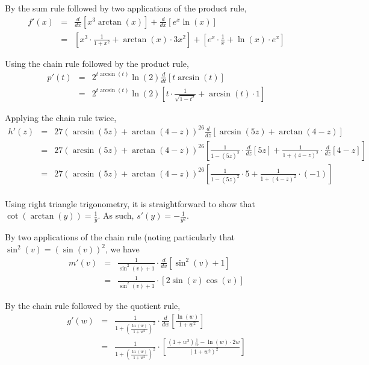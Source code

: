 \begin{activitySolution}
\ba
	  \item By the sum rule followed by two applications of the product rule,
	  \begin{eqnarray*}
	   f'(x) & = & \frac{d}{dx}[x^3 \arctan(x)] + \frac{d}{dx}[e^x \ln(x)] \\
	   	& = & \left[x^3 \cdot \frac{1}{1+x^2} + \arctan(x) \cdot 3x^2 \right] + \left[e^x \cdot \frac{1}{x} + \ln(x) \cdot e^x\right]
	  \end{eqnarray*}
           \item Using the chain rule followed by the product rule,
           \begin{eqnarray*}
           p'(t) & = & 2^{t\arcsin(t)} \ln(2) \frac{d}{dt}[t\arcsin(t)] \\
            	& = & 2^{t\arcsin(t)} \ln(2) [t \cdot \frac{1}{\sqrt{1-t^2}} + \arcsin(t) \cdot 1]
	\end{eqnarray*} 
           \item Applying the chain rule twice,
           \begin{eqnarray*}
            h'(z) & = & 27(\arcsin(5z) + \arctan(4-z))^{26} \frac{d}{dz}[\arcsin(5z) + \arctan(4-z)] \\
            	& = & 27(\arcsin(5z) + \arctan(4-z))^{26} \left[\frac{1}{1-(5z)^2} \cdot \frac{d}{dz}[5z] + \frac{1}{1+(4-z)^2} \cdot \frac{d}{dz}[4-z] \right] \\
            	& = & 27(\arcsin(5z) + \arctan(4-z))^{26} \left[\frac{1}{1-(5z)^2} \cdot 5 + \frac{1}{1+(4-z)^2} \cdot (-1) \right] \\
	  \end{eqnarray*}
  	  \item Using right triangle trigonometry, it is straightforward to show that $\cot(\arctan(y)) = \frac{1}{y}$.  As such, $s'(y) = -\frac{1}{y^2}.$
  	  \item By two applications of the chain rule (noting particularly that $\sin^2(v) = (\sin(v))^2$, we have
	  \begin{eqnarray*}
	   m'(v) & = & \frac{1}{\sin^2(v)+1} \cdot \frac{d}{dv} \left[ \sin^2(v) + 1 \right] \\
	   	& = &  \frac{1}{\sin^2(v)+1} \cdot \left[ 2\sin(v)\cos(v) \right] 
	\end{eqnarray*}
  	 \item By the chain rule followed by the quotient rule,
	 \begin{eqnarray*}
	 g'(w) & = & \frac{1}{1+ \left( \frac{\ln(w)}{1+w^2} \right)^2} \cdot \frac{d}{dw} \left[ \frac{\ln(w)}{1+w^2} \right] \\
	 	& = & \frac{1}{1+ \left( \frac{\ln(w)}{1+w^2} \right)^2} \cdot \left[ \frac{(1+w^2) \frac{1}{w} - \ln(w) \cdot 2w}{(1+w^2)^2} \right]
	\end{eqnarray*}
\ea
\end{activitySolution}
\aftera